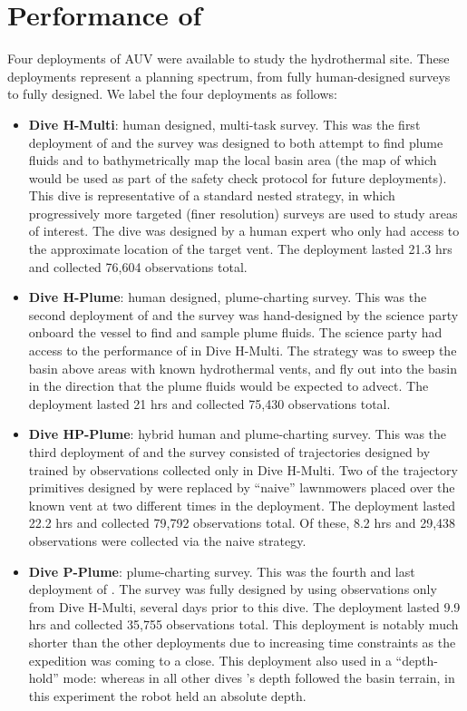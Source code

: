 \section{Performance of \PHORTEX}
\label{sec:phortex_performance}
Four deployments of AUV \Sentry were available to study the hydrothermal site. These deployments represent a planning spectrum, from fully human-designed surveys to fully \PHORTEX designed. We label the four deployments as follows:
\begin{itemize}
    \item \textbf{Dive H-Multi}: human designed, multi-task survey. This was the first deployment of \Sentry and the survey was designed to both attempt to find plume fluids and to bathymetrically map the local basin area (the map of which would be used as part of the safety check protocol for future deployments). This dive is representative of a standard nested strategy, in which progressively more targeted (finer resolution) surveys are used to study areas of interest. The dive was designed by a human expert who only had access to the approximate location of the target vent. The deployment lasted 21.3 hrs and collected 76,604 observations total.
    \item \textbf{Dive H-Plume}: human designed, plume-charting survey. This was the second deployment of \Sentry and the survey was hand-designed by the science party onboard the vessel to find and sample plume fluids. The science party had access to the performance of \Sentry in Dive H-Multi. The strategy was to sweep the basin above areas with known hydrothermal vents, and fly out into the basin in the direction that the plume fluids would be expected to advect. The deployment lasted 21 hrs and collected 75,430 observations total.
    \item \textbf{Dive HP-Plume}: hybrid human and \PHORTEX plume-charting survey. This was the third deployment of \Sentry and the survey consisted of trajectories designed by \PHORTEX trained by observations collected only in Dive H-Multi. Two of the trajectory primitives designed by \PHORTEX were replaced by ``naive'' lawnmowers placed over the known vent at two different times in the deployment. The deployment lasted 22.2 hrs and collected 79,792 observations total. Of these, 8.2 hrs and 29,438 observations were collected via the naive strategy.
    \item \textbf{Dive P-Plume}: \PHORTEX plume-charting survey. This was the fourth and last deployment of \Sentry. The survey was fully designed by \PHORTEX using observations only from Dive H-Multi, several days prior to this dive. The deployment lasted 9.9 hrs and collected 35,755 observations total. This deployment is notably much shorter than the other deployments due to increasing time constraints as the expedition was coming to a close. This deployment also used \Sentry in a ``depth-hold'' mode: whereas in all other dives \Sentry's depth followed the basin terrain, in this experiment the robot held an absolute depth.
\end{itemize}

